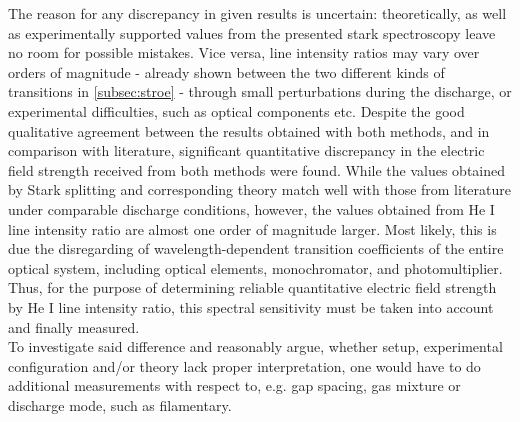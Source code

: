 \documentclass[a4paper,10pt,twoside]{article}
\begin{document}
		The reason for any discrepancy in given results is uncertain: theoretically, as well as experimentally supported values from the presented stark spectroscopy leave no room for possible mistakes. Vice versa, line intensity ratios may vary over orders of magnitude - already shown between the two different kinds of transitions in \autoref{subsec:stroe} - through small perturbations during the discharge, or experimental difficulties, such as optical components etc. Despite the good qualitative agreement between the results obtained with both methods, and in comparison with literature, significant quantitative discrepancy in the electric field strength received from both methods were found. While the values obtained by Stark splitting and corresponding theory match well with those from literature under comparable discharge conditions, however, the values obtained from He I line intensity ratio are almost one order of magnitude larger. Most likely, this is due the disregarding of wavelength-dependent transition coefficients of the entire optical system, including optical elements, monochromator, and photomultiplier. Thus, for the purpose of determining reliable quantitative electric field strength by He I line intensity ratio, this spectral sensitivity must be taken into account and finally measured.\\
		To investigate said difference and reasonably argue, whether setup, experimental configuration and/or theory lack proper interpretation, one would have to do additional measurements with respect to, e.g. gap spacing, gas mixture or discharge mode, such as filamentary.

		
		
\end{document}
